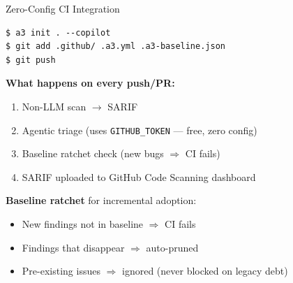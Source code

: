 \documentclass[aspectratio=169]{beamer}
\begin{document}
\begin{frame}[fragile]{Zero-Config CI Integration}

\begin{lstlisting}[style=bash]
$ a3 init . --copilot
$ git add .github/ .a3.yml .a3-baseline.json
$ git push
\end{lstlisting}

\vspace{0.5em}
\textbf{What happens on every push/PR:}
\begin{enumerate}
  \item Non-LLM scan $\to$ SARIF
  \item Agentic triage (uses \texttt{GITHUB\_TOKEN} --- free, zero config)
  \item Baseline ratchet check (new bugs $\Rightarrow$ CI fails)
  \item SARIF uploaded to GitHub Code Scanning dashboard
\end{enumerate}

\vspace{0.5em}
\textbf{Baseline ratchet} for incremental adoption:
\begin{itemize}
  \item New findings not in baseline $\Rightarrow$ \textcolor{msred}{CI fails}
  \item Findings that disappear $\Rightarrow$ auto-pruned
  \item Pre-existing issues $\Rightarrow$ ignored (never blocked on legacy debt)
\end{itemize}

\end{frame}
\end{document}
